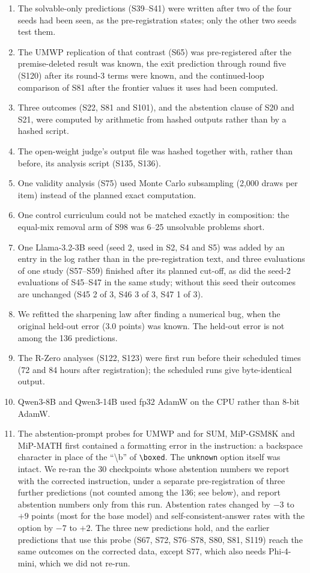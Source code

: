 \documentclass[10pt,a4paper]{article}
\newcommand{\unk}{\texttt{unknown}}
\begin{document}
\begin{enumerate}\setlength{\itemsep}{2pt}
\item The solvable-only predictions (S39--S41) were written after two of the four seeds had been seen, as the pre-registration states; only the other two seeds test them.
\item The UMWP replication of that contrast (S65) was pre-registered after the premise-deleted result was known, the exit prediction through round five (S120) after its round-3 terms were known, and the continued-loop comparison of S81 after the frontier values it uses had been computed.
\item Three outcomes (S22, S81 and S101), and the abstention clause of S20 and S21, were computed by arithmetic from hashed outputs rather than by a hashed script.
\item The open-weight judge's output file was hashed together with, rather than before, its analysis script (S135, S136).
\item One validity analysis (S75) used Monte Carlo subsampling (2,000 draws per item) instead of the planned exact computation.
\item One control curriculum could not be matched exactly in composition: the equal-mix removal arm of S98 was 6--25 unsolvable problems short.
\item One Llama-3.2-3B seed (seed 2, used in S2, S4 and S5) was added by an entry in the log rather than in the pre-registration text, and three evaluations of one study (S57--S59) finished after its planned cut-off, as did the seed-2 evaluations of S45--S47 in the same study; without this seed their outcomes are unchanged (S45 2 of 3, S46 3 of 3, S47 1 of 3).
\item We refitted the sharpening law after finding a numerical bug, when the original held-out error (3.0 points) was known. The held-out error is not among the 136 predictions.
\item The R-Zero analyses (S122, S123) were first run before their scheduled times (72 and 84 hours after registration); the scheduled runs give byte-identical output.
\item Qwen3-8B and Qwen3-14B used fp32 AdamW on the CPU rather than 8-bit AdamW.
\item The abstention-prompt probes for UMWP and for SUM, MiP-GSM8K and MiP-MATH first contained a formatting error in the instruction: a backspace character in place of the ``\textbackslash b'' of \texttt{\textbackslash boxed}. The \unk{} option itself was intact. We re-ran the 30 checkpoints whose abstention numbers we report with the corrected instruction, under a separate pre-registration of three further predictions (not counted among the 136; see below), and report abstention numbers only from this run. Abstention rates changed by $-3$ to $+9$ points (most for the base model) and self-consistent-answer rates with the option by $-7$ to $+2$. The three new predictions hold, and the earlier predictions that use this probe (S67, S72, S76--S78, S80, S81, S119) reach the same outcomes on the corrected data, except S77, which also needs Phi-4-mini, which we did not re-run.

\end{enumerate}
\end{document}
